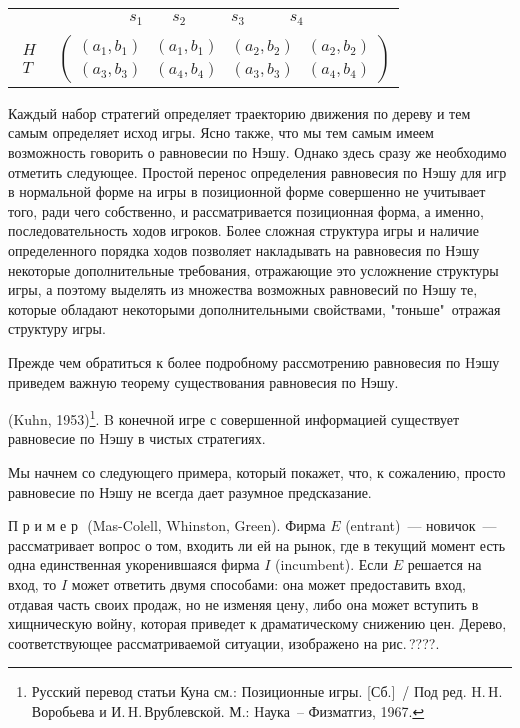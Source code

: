 \begin{center}
\begin{tabular}{cc}
&$\begin{array}{cccc} \quad s_1\quad& s_2\quad&\quad s_3\qquad& s_4\qquad \end{array}$\\
$\begin{array}{c} H\\T \end{array}$& $\left( \begin{array}{cccc}
(a_1,b_1)&(a_1,b_1)&(a_2,b_2)&(a_2,b_2)\\
(a_3,b_3)&(a_4,b_4)&(a_3,b_3)&(a_4,b_4) \end{array} \right)$\\
\end{tabular}
\end{center}

Каждый набор стратегий определяет траекторию движения по дереву и
тем самым определяет исход игры. Ясно также, что мы тем самым имеем
возможность говорить о равновесии по Нэшу. Однако здесь сразу же
необходимо отметить следующее. Простой перенос определения равновесия
по Нэшу для игр в нормальной форме на игры в позиционной форме
совершенно не учитывает того, ради чего собственно, и рассматривается
позиционная форма, а именно, последовательность ходов игроков.
Более сложная структура игры и наличие определенного порядка ходов
позволяет накладывать на равновесия по Нэшу некоторые дополнительные
требования, отражающие это усложнение структуры игры, а поэтому
выделять из множества возможных равновесий по Нэшу те, которые
обладают некоторыми дополнительными свойствами, "тоньше"\, отражая
структуру игры.

Прежде чем обратиться к более подробному рассмотрению равновесия по
Hэшу приведем важную теорему существования равновесия по Нэшу.

\begin{theorem}
{(\rm Kuhn, 1953)}\footnote{ Русский перевод статьи Куна см.:
Позиционные игры. [Сб.]~/ Под ред. H.\,H.\,Воробьева и
И.\,H.\,Врублевской.  М.: Hаука~-- Физматгиз, 1967.}.  B конечной
игре с совершенной информацией существует равновесие по Hэшу в
чистых стратегиях.
\end{theorem}

Мы начнем со следующего примера, который покажет, что, к сожалению,
просто равновесие по Нэшу не всегда дает разумное предсказание.
\smallskip

П р и м е р\,\, (Mas-Colell, Whinston, Green). Фирма $E$
(entrant)~--- новичок~--- рассматривает вопрос о том, входить ли
ей на рынок, где в текущий момент есть одна единственная
укоренившаяся фирма $I$ (incumbent). Если $E$ решается на вход, то
$I$ может ответить двумя способами: она может предоставить вход,
отдавая часть своих продаж, но не изменяя цену, либо она может
вступить в хищническую войну, которая приведет к драматическому
снижению цен. Дерево, соответствующее рассматриваемой ситуации,
изображено на рис.\,????.


